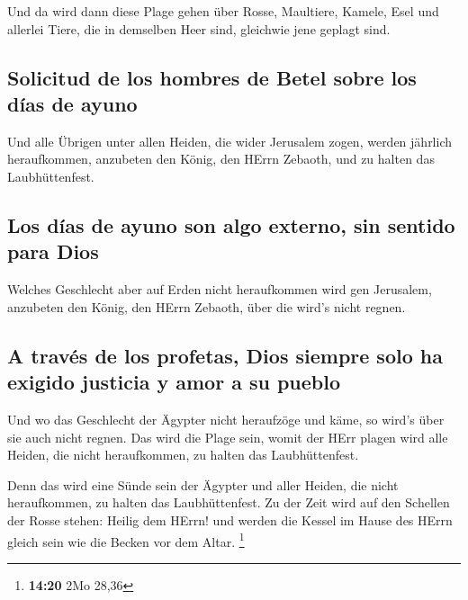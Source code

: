  Und da wird dann diese Plage gehen über Rosse,
Maultiere, Kamele, Esel und allerlei Tiere, die in demselben Heer sind,
gleichwie jene geplagt sind.

\hypertarget{solicitud-de-los-hombres-de-betel-sobre-los-duxedas-de-ayuno}{%
\subsection{Solicitud de los hombres de Betel sobre los días de
ayuno}\label{solicitud-de-los-hombres-de-betel-sobre-los-duxedas-de-ayuno}}

 Und alle Übrigen unter allen Heiden, die wider Jerusalem
zogen, werden jährlich heraufkommen, anzubeten den König, den HErrn
Zebaoth, und zu halten das Laubhüttenfest.

\hypertarget{los-duxedas-de-ayuno-son-algo-externo-sin-sentido-para-dios}{%
\subsection{Los días de ayuno son algo externo, sin sentido para
Dios}\label{los-duxedas-de-ayuno-son-algo-externo-sin-sentido-para-dios}}

 Welches Geschlecht aber auf Erden nicht heraufkommen
wird gen Jerusalem, anzubeten den König, den HErrn Zebaoth, über die
wird's nicht regnen.

\hypertarget{a-travuxe9s-de-los-profetas-dios-siempre-solo-ha-exigido-justicia-y-amor-a-su-pueblo}{%
\subsection{A través de los profetas, Dios siempre solo ha exigido
justicia y amor a su
pueblo}\label{a-travuxe9s-de-los-profetas-dios-siempre-solo-ha-exigido-justicia-y-amor-a-su-pueblo}}

 Und wo das Geschlecht der Ägypter nicht heraufzöge und
käme, so wird's über sie auch nicht regnen. Das wird die Plage sein,
womit der HErr plagen wird alle Heiden, die nicht heraufkommen, zu
halten das Laubhüttenfest.

 Denn das wird eine Sünde sein der Ägypter und aller
Heiden, die nicht heraufkommen, zu halten das Laubhüttenfest.
 Zu der Zeit wird auf den Schellen der Rosse stehen:
Heilig dem HErrn! und werden die Kessel im Hause des HErrn gleich sein
wie die Becken vor dem Altar. \footnote{\textbf{14:20} 2Mo 28,36}

